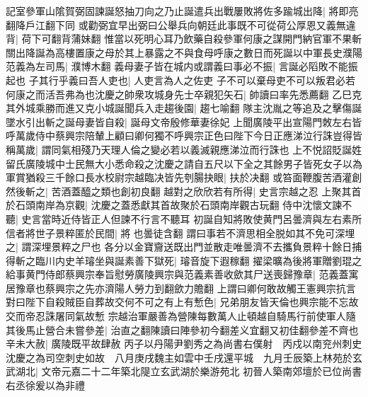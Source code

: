 記室參軍山隂賀弼固諫誕怒抽刀向之乃止誕遣兵出戰屢敗將佐多踰城出降|{
	將即亮翻降戶江翻下同}
或勸弼宜早出弼曰公舉兵向朝廷此事既不可從荷公厚恩又義無違背|{
	荷下可翻背蒲妹翻}
惟當以死明心耳乃飲藥自殺參軍何康之謀開門納官軍不果斬關出降誕為高樓置康之母於其上暴露之不與食母呼康之數日而死誕以中軍長史濮陽范義為左司馬|{
	濮博木翻}
義母妻子皆在城内或謂義曰事必不振|{
	言誕必䧟敗不能振起也}
子其行乎義曰吾人吏也|{
	人吏言為人之佐吏}
子不可以棄母吏不可以叛君必若何康之而活吾弗為也沈慶之帥衆攻城身先士卒親犯矢石|{
	帥讀曰率先悉薦翻}
乙巳克其外城乘勝而進又克小城誕聞兵入走趨後園|{
	趨七喻翻}
隊主沈胤之等追及之擊傷誕墜水引出斬之誕母妻皆自殺|{
	誕母文帝殷修華妻徐妃}
上聞廣陵平出宣陽門敇左右皆呼萬歲侍中蔡興宗陪輦上顧曰卿何獨不呼興宗正色曰陛下今日正應涕泣行誅豈得皆稱萬歲|{
	謂同氣相殘乃天理人倫之變必若以義滅親應涕泣而行誅也}
上不悦詔貶誕姓留氏廣陵城中士民無大小悉命殺之沈慶之請自五尺以下全之其餘男子皆死女子以為軍賞猶殺三千餘口長水校尉宗越臨决皆先刳腸抉眼|{
	扶於决翻}
或笞面鞭腹苦酒灌創然後斬之|{
	苦酒蓋醯之類也創初良翻}
越對之欣欣若有所得|{
	史言宗越之忍}
上聚其首於石頭南岸為京觀|{
	沈慶之蓋悉獻其首故聚於石頭南岸觀古玩翻}
侍中沈懷文諫不聽|{
	史言當時近侍皆正人但諫不行言不聽耳}
初誕自知將敗使黄門呂曇濟與左右素所信者將世子景粹匿於民間|{
	將也曇徒含翻}
謂曰事若不濟思相全脱如其不免可深埋之|{
	謂深埋景粹之尸也}
各分以金寶齎送既出門並散走唯曇濟不去攜負景粹十餘日捕得斬之臨川内史羊璿坐與誕素善下獄死|{
	璿音旋下遐稼翻}
擢梁曠為後將軍贈劉琨之給事黄門侍郎蔡興宗奉旨慰勞廣陵興宗與范義素善收歛其尸送喪歸豫章|{
	范義蓋寓居豫章也蔡興宗之先亦濟陽人勞力到翻歛力贍翻}
上謂曰卿何敢故觸王憲興宗抗言對曰陛下自殺賊臣自葬故交何不可之有上有慙色|{
	兄弟朋友皆天倫也興宗能不忘故交而帝忍誅屠同氣故慙}
宗越治軍嚴善為營陳每數萬人止頓越自騎馬行前使軍人隨其後馬止營合未嘗參差|{
	治直之翻陳讀曰陣參初今翻差义宜翻又初佳翻參差不齊也}
辛未大赦|{
	廣陵既平故肆赦}
丙子以丹陽尹劉秀之為尚書右僕射　丙戍以南兖州刺史沈慶之為司空刺史如故　八月庚戌魏主如雲中壬戌還平城　九月壬辰築上林苑於玄武湖北|{
	文帝元嘉二十二年築北隄立玄武湖於樂游苑北}
初晉人築南郊壇於已位尚書右丞徐爰以為非禮

